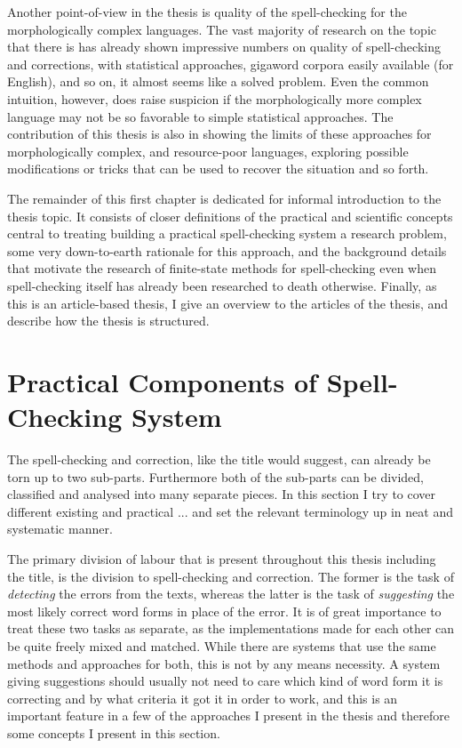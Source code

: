 \documentclass[officiallayout,draft]{unihelcompling}
\begin{document}
Another point-of-view in the thesis is quality of the spell-checking for the
morphologically complex languages. The vast majority of research on the topic
that there is has already shown impressive numbers on quality of spell-checking
and corrections, with statistical approaches, gigaword corpora easily available
(for English), and so on, it almost seems like a solved problem. Even the
common intuition, however, does raise suspicion if the morphologically more
complex language may not be so favorable to simple statistical approaches. The
contribution of this thesis is also in showing the limits of these approaches
for morphologically complex, and resource-poor languages, exploring possible
modifications or tricks that can be used to recover the situation and so forth.

The remainder of this first chapter is dedicated for informal introduction to
the thesis topic. It consists of closer definitions of the practical and
scientific concepts central to treating building a practical spell-checking
system a research problem, some very down-to-earth rationale for this approach,
and the background details that motivate the research of finite-state methods
for spell-checking even when spell-checking itself has already been researched
to death otherwise. Finally, as this is an article-based thesis, I give an
overview to the articles of the thesis, and describe how the thesis is
structured.

\section{Practical Components of Spell-Checking System}
\label{sec:practical-components}

The spell-checking and correction, like the title would suggest, can already
be torn up to two sub-parts. Furthermore both of the sub-parts can be divided,
classified and analysed into many separate pieces. In this section I try to
cover different existing and practical ... and set the relevant terminology up
in neat and systematic manner.

The primary division of labour that is present throughout this thesis including
the title, is the division to spell-checking and correction. The former is the
task of \emph{detecting} the errors from the texts, whereas the latter is the
task of \emph{suggesting} the most likely correct word forms in place of the
error. It is of great importance to treat these two tasks as separate, as the
implementations made for each other can be quite freely mixed and matched.
While there are systems that use the same methods and approaches for both,
this is not by any means necessity. A system giving suggestions should usually
not need to care which kind of word form it is correcting and by what criteria
it got it in order to work, and this is an important feature in a few of the
approaches I present in the thesis and therefore some concepts I present in
this section.
\end{document}

